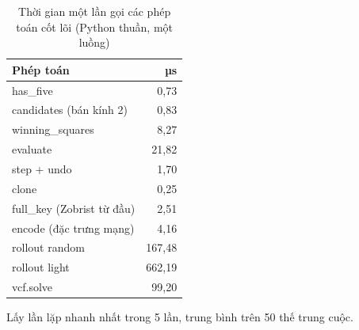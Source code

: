 \begin{table}[H]
  \centering
  \small
  \caption{Thời gian một lần gọi các phép toán cốt lõi (Python thuần, một luồng)}
  \label{tab:cs-tk-vi-mo}
  \begin{tabular}{lr}
    \toprule
    Phép toán & µs \\
    \midrule
    has\_five & 0,73 \\
    candidates (bán kính 2) & 0,83 \\
    winning\_squares & 8,27 \\
    evaluate & 21,82 \\
    step + undo & 1,70 \\
    clone & 0,25 \\
    full\_key (Zobrist từ đầu) & 2,51 \\
    encode (đặc trưng mạng) & 4,16 \\
    rollout random & 167,48 \\
    rollout light & 662,19 \\
    vcf.solve & 99,20 \\
    \bottomrule
  \end{tabular}
  \par\smallskip\parbox{.95\linewidth}{\footnotesize Lấy lần lặp nhanh nhất trong 5 lần, trung bình trên 50 thế trung cuộc.}
\end{table}
